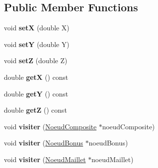 \subsection*{Public Member Functions}
\begin{DoxyCompactItemize}
\item 
void {\bfseries setX} (double X)\hypertarget{class_visiteur_deplacement_ac1ddd0f0dcf4212fbe28eab505e121b8}{}\label{class_visiteur_deplacement_ac1ddd0f0dcf4212fbe28eab505e121b8}

\item 
void {\bfseries setY} (double Y)\hypertarget{class_visiteur_deplacement_a9bce6d1e3818b57585af6ec2f928557b}{}\label{class_visiteur_deplacement_a9bce6d1e3818b57585af6ec2f928557b}

\item 
void {\bfseries setZ} (double Z)\hypertarget{class_visiteur_deplacement_ab867f2e77d82345457aa64293a4e940f}{}\label{class_visiteur_deplacement_ab867f2e77d82345457aa64293a4e940f}

\item 
double {\bfseries getX} () const \hypertarget{class_visiteur_deplacement_a960a46b22fe6c02589369bcd87cffc47}{}\label{class_visiteur_deplacement_a960a46b22fe6c02589369bcd87cffc47}

\item 
double {\bfseries getY} () const \hypertarget{class_visiteur_deplacement_a81d9762ba7ed3975889c9ce3bc71eeaf}{}\label{class_visiteur_deplacement_a81d9762ba7ed3975889c9ce3bc71eeaf}

\item 
double {\bfseries getZ} () const \hypertarget{class_visiteur_deplacement_a5d44cf6b5c0e1ed42dc6129574593c97}{}\label{class_visiteur_deplacement_a5d44cf6b5c0e1ed42dc6129574593c97}

\item 
void {\bfseries visiter} (\hyperlink{class_noeud_composite}{Noeud\+Composite} $\ast$noeud\+Composite)\hypertarget{class_visiteur_deplacement_a66d79a3935e3e3250fe4404014014ee8}{}\label{class_visiteur_deplacement_a66d79a3935e3e3250fe4404014014ee8}

\item 
void {\bfseries visiter} (\hyperlink{class_noeud_bonus}{Noeud\+Bonus} $\ast$noeud\+Bonus)\hypertarget{class_visiteur_deplacement_aaf6710f40269f480d5a90a46fb4f69e0}{}\label{class_visiteur_deplacement_aaf6710f40269f480d5a90a46fb4f69e0}

\item 
void {\bfseries visiter} (\hyperlink{class_noeud_maillet}{Noeud\+Maillet} $\ast$noeud\+Maillet)\hypertarget{class_visiteur_deplacement_add5be21f79826b296a33a9a1a4d35eb0}{}\label{class_visiteur_deplacement_add5be21f79826b296a33a9a1a4d35eb0}


\end{DoxyCompactItemize}
